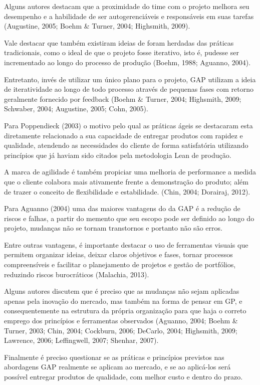 Alguns autores destacam que a proximidade do time com o projeto melhora seu desempenho e a habilidade de ser autogerenciáveis e responsáveis em suas tarefas (Augustine, 2005; Boehm \& Turner, 2004; Highsmith, 2009).

Vale destacar que também existiram ideias de foram herdadas das práticas tradicionais, como o ideal de que o projeto fosse iterativo, isto é, pudesse ser incrementado ao longo do processo de produção (Boehm, 1988; Aguanno, 2004).

Entretanto, invés de utilizar um único plano para o projeto, GAP utilizam a ideia de iteratividade ao longo de todo processo através de pequenas fases com retorno geralmente fornecido por feedback (Boehm \& Turner, 2004; Highsmith, 2009; Schwaber, 2004; Augustine, 2005; Cohn, 2005).

Para Poppendieck (2003) o motivo pelo qual as práticas ágeis se destacaram esta diretamente relacionado a sua capacidade de entregar produtos com rapidez e qualidade, atendendo as necessidades do cliente de forma satisfatória utilizando princípios que já haviam sido citados pela metodologia Lean de produção.

A marca de agilidade é também propiciar uma melhoria de performance a medida que o cliente colabora mais ativamente frente a demonstração do produto; além de trazer o conceito de flexibilidade e estabilidade. (Chin, 2004; Dorairaj, 2012).

Para Aguanno (2004) uma das maiores vantagens do da GAP é a redução de riscos e falhas, a partir do memento que seu escopo pode ser definido ao longo do projeto, mudanças não se tornam transtornos e portanto não são erros.

Entre outras vantagens, é importante destacar o uso de ferramentas visuais que permitem organizar ideias, deixar claros objetivos e fases, tornar processos compreensíveis e facilitar o planejamento de projetos e gestão de portfólios, reduzindo riscos burocráticos (Malachia, 2013).

Alguns autores discutem que é preciso que as mudanças não sejam aplicadas apenas pela inovação do mercado, mas também na forma de pensar em GP, e consequentemente na estrutura da própria organização para que haja o correto emprego dos princípios e ferramentas observados (Aguanno, 2004; Boehm \& Turner, 2003; Chin, 2004; Cockburn, 2006; DeCarlo, 2004; Highsmith, 2009; Lawrence, 2006; Leffingwell, 2007; Shenhar, 2007).

Finalmente é preciso questionar se as práticas e princípios previstos nas abordagens GAP realmente se aplicam ao mercado, e se ao aplicá-los será possível entregar produtos de qualidade, com melhor custo e dentro do prazo.


